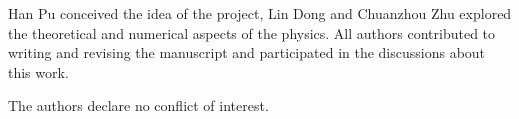 \documentclass[atoms,article,accept,moreauthors,pdftex,12pt,a4paper]{mdpi}
\begin{document}
 Han Pu conceived the idea of the project, Lin Dong and  Chuanzhou Zhu explored the theoretical and numerical aspects of the physics. All authors contributed to writing and revising the manuscript and participated in the discussions about this work.

The authors declare no conflict of interest.


\makeatletter
\renewcommand\@biblabel[1]{#1. }
\makeatother
\end{document}
